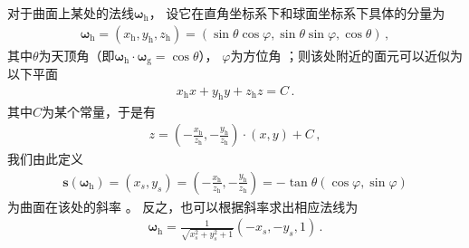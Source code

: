 对于曲面上某处的法线${\bm\omega}_{\mathrm{h}}$，
设它在直角坐标系下和球面坐标系下具体的分量为
\begin{align}
    {\bm\omega}_{\mathrm{h}}=(x_{\mathrm{h}},y_{\mathrm{h}},z_{\mathrm{h}})
    =(\sin\theta\cos\varphi,\sin\theta\sin\varphi,\cos\theta)\, ,
\end{align}
其中$\theta$为天顶角（即${\bm\omega}_{\mathrm{h}}\cdot{\bm\omega}_{\mathrm{g}}=\cos\theta$），
$\varphi$为方位角
；则该处附近的面元可以近似为以下平面
\begin{align}
    x_{\mathrm{h}}x+y_{\mathrm{h}}y+z_{\mathrm{h}}z=C\, .
\end{align}
其中$C$为某个常量，于是有
\begin{align}
    z=\left(-\frac{x_{\mathrm{h}}}{z_{\mathrm{h}}},
    -\frac{y_{\mathrm{h}}}{z_{\mathrm{h}}}\right)\cdot(x,y)+C\, ,
\end{align}
我们由此定义
\begin{align}\label{eq:08-ex01-slope-of-surface}
    {\bm s}({\bm\omega}_{\mathrm{h}})=(x_s,y_s)
    =\left(-\frac{x_{\mathrm{h}}}{z_{\mathrm{h}}},
    -\frac{y_{\mathrm{h}}}{z_{\mathrm{h}}}\right)
    =-\tan\theta(\cos\varphi,\sin\varphi)
\end{align}
为曲面在该处的斜率
。
反之，也可以根据斜率求出相应法线为
\begin{align}\label{eq:08-ex01-normals-by-slope}
    {\bm\omega}_{\mathrm{h}}=\frac{1}{\sqrt{x_s^2+y_s^2+1}}(-x_s,-y_s,1)\, .
\end{align}


